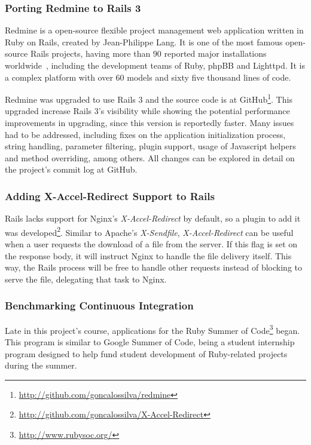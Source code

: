 \subsubsection{Porting Redmine to Rails 3}
Redmine is a open-source flexible project management web application written in Ruby on Rails, created by Jean-Philippe Lang. It is one of the most famous open-source Rails projects, having more than 90 reported major installations worldwide~\cite{redmine_installations}, including the development teams of Ruby, phpBB and Lighttpd. It is a complex platform with over 60 models and sixty five thousand lines of code.

Redmine was upgraded to use Rails 3 and the source code is at GitHub\footnote{\url{http://github.com/goncalossilva/redmine}}. This upgraded increase Rails 3's visibility while showing the potential performance improvements in upgrading, since this version is reportedly faster. Many issues had to be addressed, including fixes on the application initialization process, string handling, parameter filtering, plugin support, usage of Javascript helpers and method overriding, among others. All changes can be explored in detail on the project's commit log at GitHub.

\subsubsection{Adding X-Accel-Redirect Support to Rails}
Rails lacks support for Nginx's \textit{X-Accel-Redirect} by default, so a plugin to add it was developed\footnote{\url{http://github.com/goncalossilva/X-Accel-Redirect}}. Similar to Apache's \textit{X-Sendfile}, \textit{X-Accel-Redirect} can be useful when a user requests the download of a file from the server. If this flag is set on the response body, it will instruct Nginx to handle the file delivery itself. This way, the Rails process will be free to handle other requests instead of blocking to serve the file, delegating that task to Nginx.

\subsubsection{Benchmarking Continuous Integration}
Late in this project's course, applications for the Ruby Summer of Code\footnote{\url{http://www.rubysoc.org/}} began. This program is similar to Google Summer of Code, being a student internship program designed to help fund student development of Ruby-related projects during the summer.

